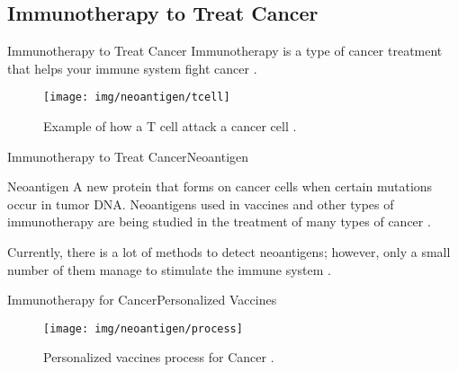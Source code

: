 \documentclass[10pt]{beamer}
\newcommand{\1}{
	\setbeamertemplate{background}{
		\texttt{[image: img/1]}
		\tikz[overlay] \fill[fill opacity=0.75,fill=white] (0,0) rectangle (-\paperwidth,\paperheight);
	}
}
\begin{document}
\subsection{Immunotherapy to Treat Cancer}

\begin{frame}{Immunotherapy to Treat Cancer}{}		
	Immunotherapy is a type of cancer treatment that helps your immune system fight cancer \cite{inmunoterapy2022}.
	
	\begin{figure}
		\texttt{[image: img/neoantigen/tcell]}
		\caption{Example of how a T cell attack a cancer cell \cite{nortshore2022}.}
	\end{figure}		
\end{frame}

\begin{frame}{Immunotherapy to Treat Cancer}{Neoantigen}		
	\begin{block}{Neoantigen}
		A new protein that forms on cancer cells when certain mutations occur in tumor DNA. Neoantigens used in vaccines and other types of immunotherapy are being studied in the treatment of many types of cancer \cite{NCIdictionary2022, borden2022cancer}.
	\end{block} 
	\begin{block}{}
		Currently, there is a lot of methods to detect neoantigens; however, only a small number of them manage to stimulate the immune system \cite{chen2021challenges, hao2021improvement}.
	\end{block}
\end{frame}


\begin{frame}{Immunotherapy for Cancer}{Personalized Vaccines}	
	\begin{figure}
		\texttt{[image: img/neoantigen/process]}
		\caption{Personalized vaccines process for Cancer \cite{peng2019neoantigen}.}
	\end{figure}		
\end{frame}
\end{document}
